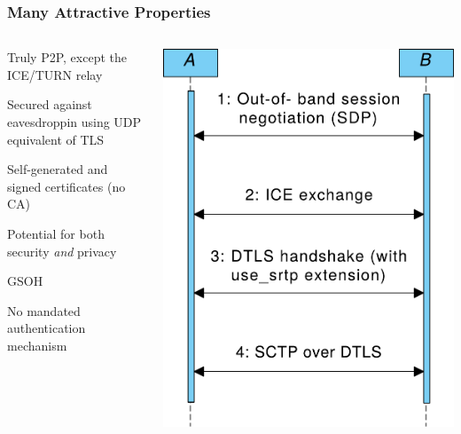 \documentclass[handout, notes=hide]{beamer}
\begin{document}

\begin{frame}
\frametitle{Many Attractive Properties}

\begin{columns}[T]
\begin{column}[T]{0.6\textwidth}
\setlength{\parskip}{0.5em}

Truly P2P, except the ICE/TURN relay

Secured against eavesdroppin using UDP equivalent of TLS

Self-generated and signed certificates (no CA)

Potential for both security {\it and\/} privacy

GSOH

No mandated authentication mechanism

\end{column}
\begin{column}[T]{0.4\textwidth}
\vspace{2.5em}
\includegraphics[width=1.0\textwidth]{webrtc-simplified-thinner}
\end{column}
\end{columns}
\end{frame}
\end{document}
